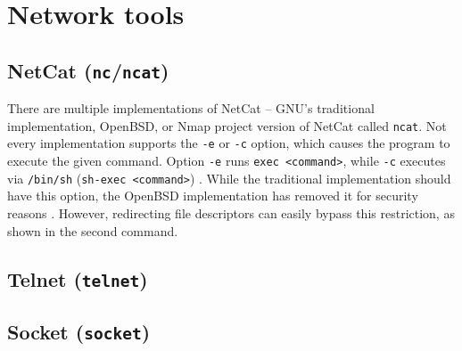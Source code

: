 \section{Network tools}

\subsection{NetCat (\texttt{nc}/\texttt{ncat})}

There are multiple implementations of NetCat -- GNU's traditional implementation, OpenBSD, or Nmap project version of NetCat called \texttt{ncat}. Not every implementation supports the \texttt{-e} or \texttt{-c} option, which causes the program to execute the given command. Option \texttt{-e} runs \texttt{exec <command>}, while \texttt{-c} executes via \texttt{/bin/sh} (\texttt{sh-exec <command>}) \cite{ncat-man}. While the traditional implementation should have this option, the OpenBSD implementation has removed it for security reasons \cite{nc-man}. However, redirecting file descriptors can easily bypass this restriction, as shown in the second command.






\subsection{Telnet (\texttt{telnet})} \label{telnet}






\subsection{Socket (\texttt{socket})}

